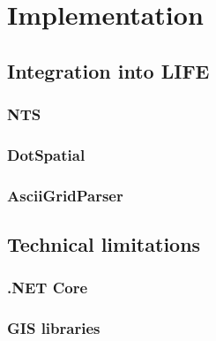 
\chapter{Implementation}



\section{Integration into LIFE}


\subsection{NTS}


\subsection{DotSpatial}


\subsection{AsciiGridParser}



\section{Technical limitations}


\subsection{.NET Core}


\subsection{GIS libraries}
